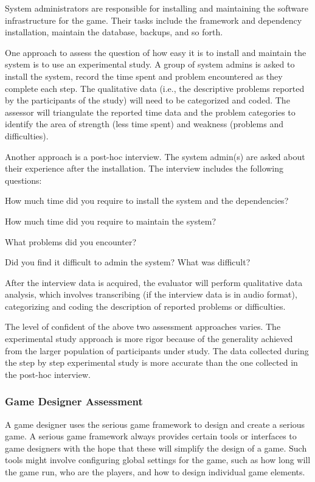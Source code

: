 \documentclass{sigchi}
\begin{document}
System administrators are responsible for installing and maintaining the software infrastructure
for the game. Their tasks include the framework and dependency installation, maintain the database, backups, and so forth.

One approach to assess the question of how easy it is to install and maintain the system is to use
an experimental study. A group of system admins is asked to install the system, record the time
spent and problem encountered as they complete each step. The qualitative data (i.e., the
descriptive problems reported by the participants of the study) will need to be categorized and
coded. The assessor will triangulate the reported time data and the problem categories to identify
the area of strength (less time spent) and weakness (problems and difficulties).

Another approach is a post-hoc interview. The system admin(s) are asked about their experience
after the installation. The interview includes the following questions:

\begin{compactitem}
\item How much time did you require to install the system and the dependencies?
\item How much time did you require to maintain the system?
\item What problems did you encounter?
\item Did you find it difficult to admin the system? What was difficult?
\end{compactitem}

After the interview data is acquired, the evaluator will perform qualitative data
analysis, which involves transcribing (if the interview data is in audio format),
categorizing and coding the description of reported problems or difficulties.

The level of confident of the above two assessment approaches varies. The experimental study
approach is more rigor because of the generality achieved from the larger population of
participants under study. The data collected during the step by step experimental study is more
accurate than the one collected in the post-hoc interview.

\subsubsection{Game Designer Assessment}

A game designer uses the serious game framework to design and create a serious game.
A serious game framework always provides certain tools or interfaces to game designers
with the hope that these will simplify the design of a game. Such tools might involve
configuring global settings for the game, such as how long will the game run, who are the
players, and how to design individual game elements.
\end{document}
